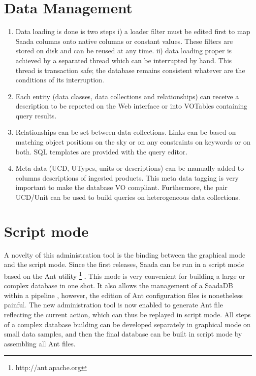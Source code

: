 \documentclass[11pt,twoside]{article}
\begin{document}
\section{Data Management}
\begin{enumerate}
\item Data loading is done is two steps i) a loader filter must be edited first to map Saada columns onto native columns or constant values. These filters are stored on disk and can be reused at any time. ii) data loading proper is achieved by a separated thread which can be interrupted by hand. This thread is transaction safe; the database remains consistent whatever are the conditions of its interruption.
\item Each entity (data classes, data collections and relationships) can receive a description to be reported on the Web interface or into VOTables containing query results.
\item Relationships can be set between data collections. Links can be based on matching object positions on the sky or on any constraints on keywords or on both. SQL templates are provided with the query editor.
\item Meta data (UCD, UTypes, units or descriptions) can be manually added to columns descriptions of ingested products. This meta data tagging is very important to make the database VO compliant. Furthermore, the pair UCD/Unit can be used to build queries on heterogeneous data collections.
\end{enumerate}

\section{Script mode}
A novelty of this administration tool is the binding between the graphical mode and the script mode.
Since the first releases, Saada can be run in a script mode based on the Ant utility \footnote{http://ant.apache.org} . This mode is very convenient for building a large or complex database in one shot. It also allows the management of a SaadaDB within a pipeline \citep{P03_adassxxii}, however, the edition of Ant configuration files is nonetheless painful. The new administration tool is now enabled to generate Ant file reflecting the current action, which can thus be replayed in script mode. All steps of a complex database building can be developed separately in graphical mode on small data samples, and then the final database can be built in script mode by assembling all Ant files.
\end{document}
